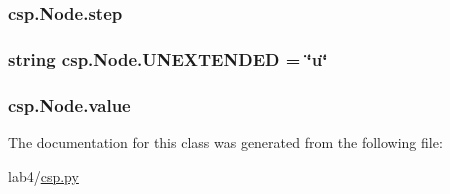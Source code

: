 \subsubsection[{step}]{\setlength{\rightskip}{0pt plus 5cm}csp.\+Node.\+step}\label{classcsp_1_1_node_ad24c152aa4db47cdcaf07e9f300da283}
\hypertarget{classcsp_1_1_node_adb2acf3476fbb84b27a669067cef8c53}{}
\subsubsection[{U\+N\+E\+X\+T\+E\+N\+D\+E\+D}]{\setlength{\rightskip}{0pt plus 5cm}string csp.\+Node.\+U\+N\+E\+X\+T\+E\+N\+D\+E\+D = \char`\"{}u\char`\"{}\hspace{0.3cm}{\ttfamily [static]}}\label{classcsp_1_1_node_adb2acf3476fbb84b27a669067cef8c53}
\hypertarget{classcsp_1_1_node_a59b36f494d919498b7a115cb7fcb889d}{}
\subsubsection[{value}]{\setlength{\rightskip}{0pt plus 5cm}csp.\+Node.\+value}\label{classcsp_1_1_node_a59b36f494d919498b7a115cb7fcb889d}


The documentation for this class was generated from the following file\+:\begin{DoxyCompactItemize}
\item 
lab4/\hyperlink{csp_8py}{csp.\+py}\end{DoxyCompactItemize}
